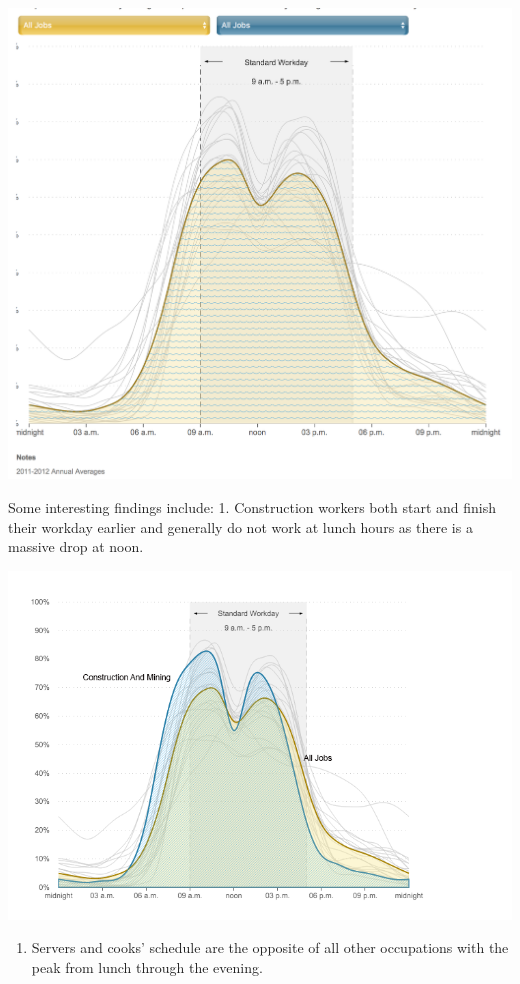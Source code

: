 \documentclass[]{book}
\providecommand{\tightlist}{%
  \setlength{\itemsep}{0pt}\setlength{\parskip}{0pt}}
\begin{document}
\includegraphics{images/npr_workday.png}

Some interesting findings include:
1. Construction workers both start and finish their workday earlier and generally do not work at lunch hours as there is a massive drop at noon.

\includegraphics{images/construction.png}

\begin{enumerate}
\def\labelenumi{\arabic{enumi}.}
\setcounter{enumi}{1}
\tightlist
\item
  Servers and cooks' schedule are the opposite of all other occupations with the peak from lunch through the evening.
\end{enumerate}
\end{document}
